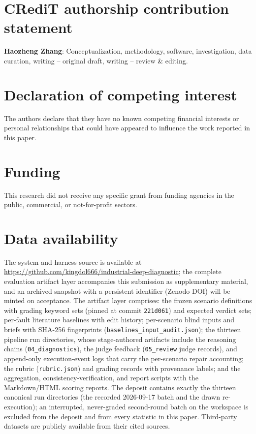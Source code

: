 \documentclass[preprint,10pt]{elsarticle}
\begin{document}
\section*{CRediT authorship contribution statement}
\textbf{Haozheng Zhang}: Conceptualization, methodology, software, investigation, data curation, writing -- original draft, writing -- review \& editing.

\section*{Declaration of competing interest}
The authors declare that they have no known competing financial interests or personal relationships that could have appeared to influence the work reported in this paper.

\section*{Funding}
This research did not receive any specific grant from funding agencies in the public, commercial, or not-for-profit sectors.

\section*{Data availability}
The system and harness source is available at \url{https://github.com/kingdol666/industrial-deep-diagnostic}; the complete evaluation artifact layer accompanies this submission as supplementary material, and an archived snapshot with a persistent identifier (Zenodo DOI) will be minted on acceptance. The artifact layer comprises: the frozen scenario definitions with grading keyword sets (pinned at commit \texttt{221d061}) and expected verdict sets; per-fault literature baselines with edit history; per-scenario blind inputs and briefs with SHA-256 fingerprints (\texttt{baselines\_input\_audit.json}); the thirteen pipeline run directories, whose stage-authored artifacts include the reasoning chains (\texttt{04\_diagnostics}), the judge feedback (\texttt{05\_review} judge records), and append-only execution-event logs that carry the per-scenario repair accounting; the rubric (\texttt{rubric.json}) and grading records with provenance labels; and the aggregation, consistency-verification, and report scripts with the Markdown/HTML scoring reports. The deposit contains exactly the thirteen canonical run directories (the recorded 2026-09-17 batch and the drawn re-execution); an interrupted, never-graded second-round batch on the workspace is excluded from the deposit and from every statistic in this paper. Third-party datasets are publicly available from their cited sources.
\end{document}
